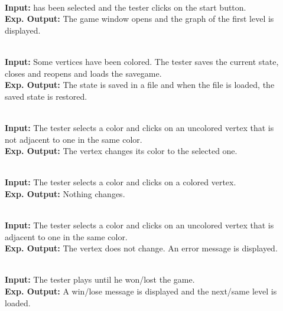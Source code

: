 \begin{description}

	\item[] \textbf{} \\
	\textbf{Input:} \graphcoloring has been selected and the tester clicks on the start button. \\
	\textbf{Exp. Output:} The game window opens and the graph of the first level is displayed.
	
	\item[] \textbf{} \\
	\textbf{Input:} Some vertices have been colored. The tester saves the current state, closes and reopens \graphcoloring and loads the savegame. \\
	\textbf{Exp. Output:} The state is saved in a file and when the file is loaded, the saved state is restored.
	
	\item[] \textbf{} \\
	\textbf{Input:} The tester selects a color and clicks on an uncolored vertex that is not adjacent to one in the same color. \\
	\textbf{Exp. Output:} The vertex changes its color to the selected one.
	
	\item[] \textbf{} \\
	\textbf{Input:} The tester selects a color and clicks on a colored vertex. \\
	\textbf{Exp. Output:} Nothing changes.
	
	\item[] \textbf{} \\
	\textbf{Input:} The tester selects a color and clicks on an uncolored vertex that is adjacent to one in the same color. \\
	\textbf{Exp. Output:} The vertex does not change. An error message is displayed.
	
	\item[] \textbf{} \\
	\textbf{Input:} The tester plays until he won/lost the game. \\
	\textbf{Exp. Output:} A win/lose message is displayed and the next/same level is loaded.
	
\end{description}


